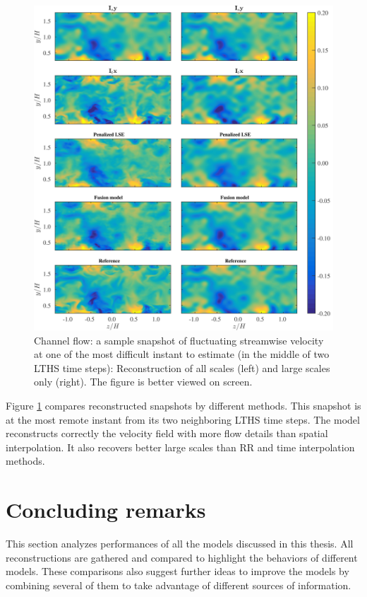 \begin{figure}
\includegraphics[width=\textwidth]{./images/comparisons/channel/improper_outer_spacespacing_10_timespacing_10_subplots_all_t006.png}
\caption{\label{fig:final_channel_fields} Channel flow: a sample snapshot of fluctuating streamwise velocity at one of the most difficult instant to estimate (in the middle of two LTHS time steps): Reconstruction of all scales (left) and large scales only (right). The figure is better viewed on screen.}
\end{figure}

Figure \ref{fig:final_channel_fields} compares reconstructed snapshots by different methods. This snapshot is at the most remote instant from its two neighboring LTHS time steps. The model reconstructs correctly the velocity field with more flow details than spatial interpolation. It also recovers better large scales than RR and time interpolation methods.

\section{Concluding remarks}
This section analyzes performances of all the models discussed in this thesis. All reconstructions are gathered and compared to highlight the behaviors of different models. These comparisons also suggest further ideas to improve the models by combining several of them to take advantage of different sources of information. 

